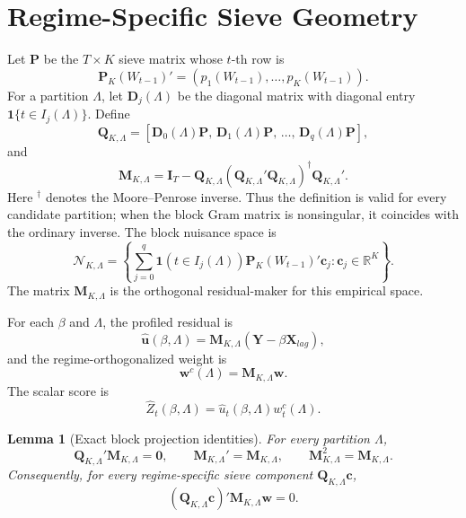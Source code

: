 \documentclass[12pt]{article} %
\numberwithin{equation}{section}
\newtheorem{lemma}{Lemma}
\theoremstyle{definition}
\newcommand{\ind}{\mathbf 1}
\newcommand{\R}{\mathbb R}
\begin{document}
\section{Regime-Specific Sieve Geometry}
\label{sec:geometry}

Let \(\bm P\) be the \(T\times K\) sieve matrix whose \(t\)-th row is
\[
    \bm P_K(W_{t-1})'=(p_1(W_{t-1}),\ldots,p_K(W_{t-1})).
\]
For a partition \(\Lambda\), let \(\bm D_j(\Lambda)\) be the diagonal matrix with diagonal entry \(\ind\{t\in I_j(\Lambda)\}\). Define
\begin{equation}
    \bm Q_{K,\Lambda}
    =
    \left[
    \bm D_0(\Lambda)\bm P,\,
    \bm D_1(\Lambda)\bm P,\,
    \ldots,\,
    \bm D_q(\Lambda)\bm P
    \right],
    \label{eq:block-q}
\end{equation}
and
\begin{equation}
    \bm M_{K,\Lambda}
    =
    \bm I_T
    -
    \bm Q_{K,\Lambda}
    (\bm Q_{K,\Lambda}'\bm Q_{K,\Lambda})^\dagger
    \bm Q_{K,\Lambda}'.
    \label{eq:block-m}
\end{equation}
Here \({}^\dagger\) denotes the Moore--Penrose inverse. Thus the definition is valid for every candidate partition; when the block Gram matrix is nonsingular, it coincides with the ordinary inverse.
The block nuisance space is
\[
    \mathcal N_{K,\Lambda}
    =
    \left\{
      \sum_{j=0}^q
      \ind(t\in I_j(\Lambda))\bm P_K(W_{t-1})'\bm c_j:
      \bm c_j\in\R^K
    \right\}.
\]
The matrix \(\bm M_{K,\Lambda}\) is the orthogonal residual-maker for this empirical space.

For each \(\beta\) and \(\Lambda\), the profiled residual is
\begin{equation}
    \widehat{\bm u}(\beta,\Lambda)
    =
    \bm M_{K,\Lambda}(\bm Y-\beta\bm X_{lag}),
    \label{eq:block-profile-resid}
\end{equation}
and the regime-orthogonalized weight is
\begin{equation}
    \bm w^c(\Lambda)
    =
    \bm M_{K,\Lambda}\bm w.
    \label{eq:block-weight}
\end{equation}
The scalar score is
\begin{equation}
    \widehat Z_t(\beta,\Lambda)
    =
    \widehat u_t(\beta,\Lambda)w_t^c(\Lambda).
    \label{eq:block-score}
\end{equation}

\begin{lemma}[Exact block projection identities]
\label{lem:block-identities}
For every partition \(\Lambda\),
\[
    \bm Q_{K,\Lambda}'\bm M_{K,\Lambda}=\bm0,
    \qquad
    \bm M_{K,\Lambda}'=\bm M_{K,\Lambda},
    \qquad
    \bm M_{K,\Lambda}^2=\bm M_{K,\Lambda}.
\]
Consequently, for every regime-specific sieve component \(\bm Q_{K,\Lambda}\bm c\),
\[
    (\bm Q_{K,\Lambda}\bm c)'
    \bm M_{K,\Lambda}\bm w
    =
    0.
\]
\end{lemma}
\end{document}
